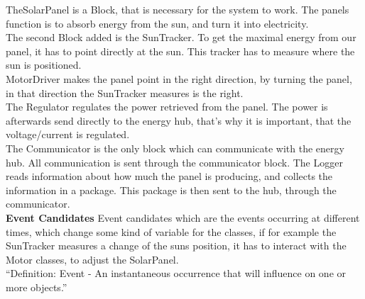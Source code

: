 \documentclass[12pt,a4paper]{report}
\begin{document}
TheSolarPanel is a Block, that is necessary for the system to work. The panels function is to absorb energy from the sun, and turn it into electricity.\\

The second Block added is the SunTracker. To get the maximal energy from our panel, it has to point directly at the sun. This tracker has to measure where the sun is positioned.\\

MotorDriver makes the panel point in the right direction, by turning the panel, in that direction the SunTracker measures is the right.\\

The Regulator regulates the power retrieved from the panel. The power is afterwards send directly to the energy hub, that’s why it is important, that the voltage/current is regulated.\\

The Communicator is the only block which can communicate with the energy hub. All communication is sent through the communicator block.
The Logger reads information about how much the panel is producing, and collects the information in a package. This package is then sent to the hub, through the communicator.\\


\textbf{Event Candidates}
Event candidates which are the events occurring at different times, which change some kind of variable for the classes, if for example the SunTracker measures a change of the suns position, it has to interact with the Motor classes, to adjust the SolarPanel.\\

“Definition: Event - An instantaneous occurrence that will influence on one or more objects.”\\
\end{document}
